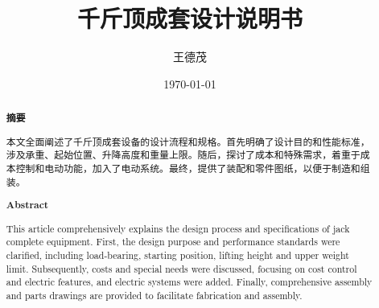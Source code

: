 \documentclass[12pt, a4paper, oneside]{ctexart}
\begin{document}

\title{\textbf{千斤顶成套设计说明书}}
\author{王德茂}
\date{\today}
\maketitle

\begin{abstract}
  \begin{center}
    \textbf{摘要}
\end{center}
  
  
  本文全面阐述了千斤顶成套设备的设计流程和规格。首先明确了设计目的和性能标准，涉及承重、起始位置、升降高度和重量上限。随后，探讨了成本和特殊需求，着重于成本控制和电动功能，加入了电动系统。最终，提供了装配和零件图纸，以便于制造和组装。
    
\end{abstract}

\begin{abstract}
  \begin{center}
    \textbf{Abstract}
\end{center}

  This article comprehensively explains the design process and specifications of jack complete equipment. First, the design purpose and performance standards were clarified, including load-bearing, starting position, lifting height and upper weight limit. Subsequently, costs and special needs were discussed, focusing on cost control and electric features, and electric systems were added. Finally, comprehensive assembly and parts drawings are provided to facilitate fabrication and assembly.
    
\end{abstract}
\newpage
\end{document}
